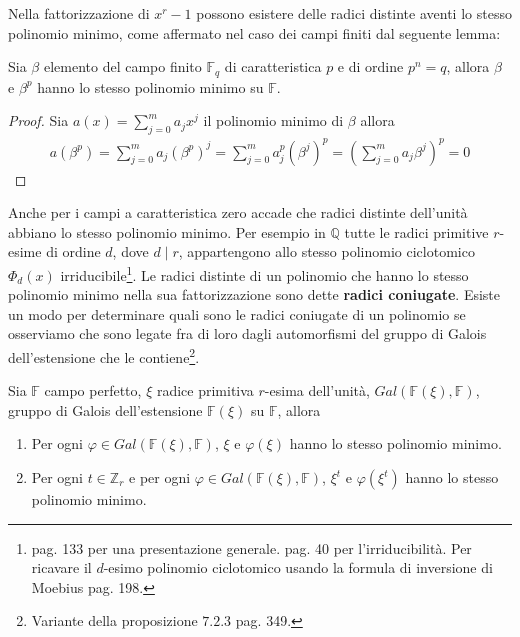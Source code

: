 Nella fattorizzazione di $x^r - 1$ possono esistere delle radici distinte
aventi lo stesso polinomio minimo, come affermato nel caso dei campi finiti dal
seguente lemma:
\begin{lemmax} \label{le:lemmaGalois}
   Sia $\beta$ elemento del campo finito $\mathbb{F}_{q}$ di
caratteristica $p$ e di ordine $p^n=q$, allora $\beta$ e $\beta^{p}$ hanno lo
stesso polinomio minimo su $\mathbb{F}$.
\end{lemmax}
\begin{proof}
   Sia $a(x) = \sum_{j=0}^{m} a_{j}x^j$ il polinomio minimo di $\beta$
   allora
   \begin{align*}
      a(\beta^p ) = \sum_{j=0}^{m} a_{j} (\beta^p)^j
                  = \sum_{j=0}^{m} a_{j}^p (\beta^j)^p
                  = (\sum_{j=0}^{m} a_{j} \beta^j )^p
                  = 0
   \end{align*}
\end{proof}
\noindent
Anche per i campi a caratteristica zero accade che radici distinte
dell'unità abbiano lo stesso polinomio minimo. Per esempio in $\mathbb{Q}$ tutte
le radici primitive $r$-esime di ordine $d$, dove $d \mid r$, appartengono allo stesso polinomio ciclotomico $\Phi_{d}(x)$ irriducibile\footnote{\cite{cattaneo}
pag. 133 per una presentazione generale. \cite{milne} pag. 40 per
l'irriducibilità. Per ricavare il $d$-esimo polinomio ciclotomico usando la formula di inversione di Moebius \cite{sivarama} pag. 198.}.
Le radici distinte di un polinomio che hanno lo
stesso polinomio minimo nella sua fattorizzazione sono dette {\bf radici coniugate}.
Esiste un modo per determinare quali sono le radici coniugate di un polinomio
se osserviamo che sono legate fra di loro dagli automorfismi del gruppo di Galois
dell'estensione che le contiene\footnote{Variante della
proposizione $7.2.3$ \cite{cattaneo} pag. 349.}.
\begin{teorema}\label{teo:stesseRadici}
Sia $\mathbb{F}$ campo perfetto, $\xi$ radice primitiva $r$-esima
dell'unità, $Gal(\mathbb{F}(\xi), \mathbb{F})$, gruppo di Galois
dell'estensione $\mathbb{F}(\xi) $ su $ \mathbb{F}$, allora
\begin{enumerate}
   \item Per ogni $\varphi \in Gal(\mathbb{F}(\xi), \mathbb{F})$, $\xi$ e $\varphi(\xi)$ hanno lo stesso
polinomio minimo.
   \item Per ogni $t \in \mathbb{Z}_{r}$ e per ogni $\varphi \in Gal(\mathbb{F}(\xi), \mathbb{F})$, $\xi^{t}$ e
$\varphi(\xi^{t})$ hanno lo stesso polinomio minimo.
\end{enumerate}
\end{teorema}
